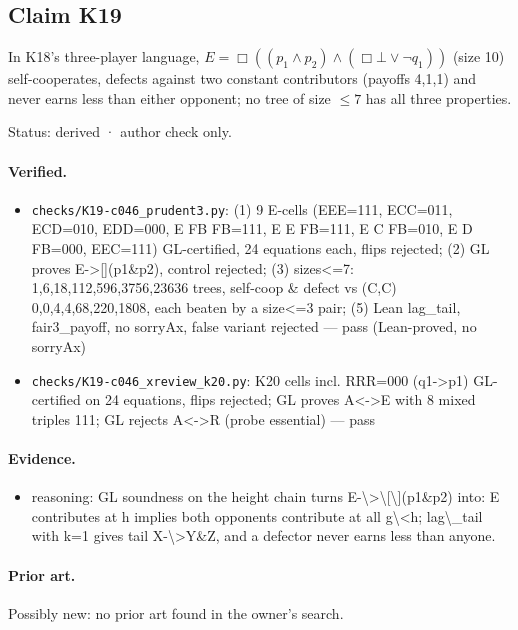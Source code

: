\documentclass{article}
\begin{document}
\subsection*{Claim K19}

In K18's three-player language, $E=\Box((p_1\land p_2)\land(\Box\bot\lor\neg q_1))$ (size 10) self-cooperates, defects against two constant contributors (payoffs 4,1,1) and never earns less than either opponent; no tree of size $\le7$ has all three properties.

Status: derived · author check only.

\paragraph{Verified.}
\begin{itemize}
\item \texttt{checks/K19-c046\_prudent3.py}: (1) 9 E-cells (EEE=111, ECC=011, ECD=010, EDD=000, E FB FB=111, E E FB=111, E C FB=010, E D FB=000, EEC=111) GL-certified, 24 equations each, flips rejected; (2) GL proves E-\textgreater{}[](p1\&p2), control rejected; (3) sizes\textless{}=7: 1,6,18,112,596,3756,23636 trees, self-coop \& defect vs (C,C) 0,0,4,4,68,220,1808, each beaten by a size\textless{}=3 pair; (5) Lean lag\_tail, fair3\_payoff, no sorryAx, false variant rejected --- pass (Lean-proved, no sorryAx)
\item \texttt{checks/K19-c046\_xreview\_k20.py}: K20 cells incl. RRR=000 (q1-\textgreater{}p1) GL-certified on 24 equations, flips rejected; GL proves A\textless{}-\textgreater{}E with 8 mixed triples 111; GL rejects A\textless{}-\textgreater{}R (probe essential) --- pass
\end{itemize}

\paragraph{Evidence.}
\begin{itemize}
\item reasoning: GL soundness on the height chain turns E-\textbackslash{}\textgreater{}\textbackslash{}[\textbackslash{}](p1\&p2) into: E contributes at h implies both opponents contribute at all g\textbackslash{}\textless{}h; lag\textbackslash{}\_tail with k=1 gives tail X-\textbackslash{}\textgreater{}Y\&Z, and a defector never earns less than anyone.
\end{itemize}

\paragraph{Prior art.} Possibly new: no prior art found in the owner's search.
\end{document}
